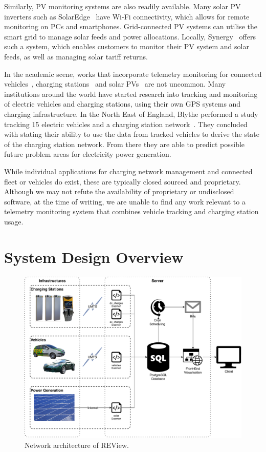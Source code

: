 Similarly, PV monitoring systems are also readily available. Many solar PV inverters such as SolarEdge~\cite{solaredge_technologies_inc._solaredge_nodate} have Wi-Fi connectivity, which allows for remote monitoring on PCs and smartphones. Grid-connected PV systems can utilise the smart grid to manage solar feeds and power allocations. Locally, Synergy~\cite{synergy_solar_nodate} offers such a system, which enables customers to monitor their PV system and solar feeds, as well as managing solar tariff returns.

In the academic scene, works that incorporate telemetry monitoring for connected vehicles~\cite{rybak_systems_2017, amadeo_information-centric_2016, siegel_survey_2018}, charging stations~\cite{amjad_review_2018, shaukat_survey_2018, zhou_incentive-based_2018} and solar PVs~\cite{manghani_internet_2018, touati_investigation_2016} are not uncommon. Many institutions around the world have started research into tracking and monitoring of electric vehicles and charging stations, using their own GPS systems and charging infrastructure. In the North East of England, Blythe performed a study tracking 15 electric vehicles and a charging station network~\cite{hill_tracking_2012}. They concluded with stating their ability to use the data from tracked vehicles to derive the state of the charging station network. From there they are able to predict possible future problem areas for electricity power generation. 

While individual applications for charging network management and connected fleet or vehicles do exist, these are typically closed sourced and proprietary. Although we may not refute the availability of proprietary or undisclosed software, at the time of writing, we are unable to find any work relevant to a telemetry monitoring system that combines vehicle tracking and charging station usage.

\section{System Design Overview}
\label{sec:9:sdo}

\begin{figure}[H]
	\centering
	\includegraphics[width=\linewidth]{arch}
	\caption{Network architecture of REView.}
	\label{fig:9:arch}
\end{figure}

